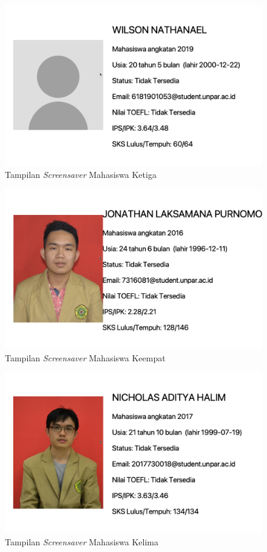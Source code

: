 \begin{figure}[H]
	\centering
	\includegraphics[scale=0.3]{Gambar/ss3.png}
	\caption{Tampilan \textit{Screensaver} Mahasiswa Ketiga}
	\label{fig:5_ss3}
\end{figure}

\begin{figure}[H]
	\centering
	\includegraphics[scale=0.3]{Gambar/ss4.png}
	\caption{Tampilan \textit{Screensaver} Mahasiswa Keempat}
	\label{fig:5_ss4}
\end{figure}

\begin{figure}[H]
	\centering
	\includegraphics[scale=0.3]{Gambar/ss5.png}
	\caption{Tampilan \textit{Screensaver} Mahasiswa Kelima}
	\label{fig:5_ss5}
\end{figure}

